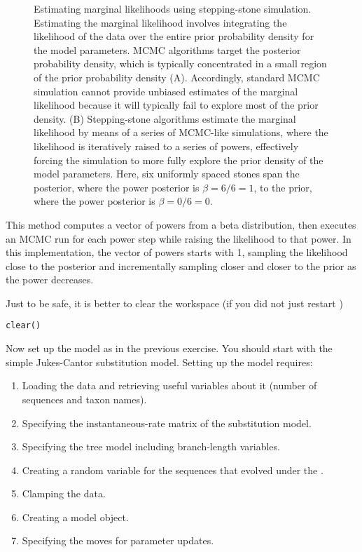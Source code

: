 \begin{figure}[h!]
\centering
{}
\caption{\small Estimating marginal likelihoods using stepping-stone simulation. 
Estimating the marginal likelihood involves integrating the likelihood of the data over the entire prior probability density for the model parameters.
MCMC algorithms target the posterior probability density, which is typically concentrated in a small region of the prior probability density (A).
Accordingly, standard MCMC simulation cannot provide unbiased estimates of the marginal likelihood because it will typically fail to explore most of the prior density.
(B) Stepping-stone algorithms estimate the marginal likelihood by means of a series of MCMC-like simulations, where the likelihood is iteratively raised to a series of powers, effectively forcing the simulation to more fully explore the prior density of the model parameters.
Here, six uniformly spaced stones span the posterior, where the power posterior is $\beta=6/6=1$, to the prior, where the power posterior is $\beta=0/6=0$.}
\label{fig:jc}
\end{figure}


This method computes a vector of powers from a beta distribution, then executes an MCMC run for each power step while raising the likelihood to that power. In this implementation, the vector of powers starts with 1, sampling the likelihood close to the posterior and incrementally sampling closer and closer to the prior as the power decreases. 

Just to be safe, it is better to clear the workspace (if you did not just restart \RevBayes)
{\tt \begin{snugshade*}
\begin{lstlisting}
clear()
\end{lstlisting}
\end{snugshade*}}

Now set up the model as in the previous exercise. You should start with the simple Jukes-Cantor substitution model. 
Setting up the model requires:
\begin{enumerate}
\item Loading the data and retrieving useful variables about it (\EG number of sequences and taxon names).
\item Specifying the instantaneous-rate matrix of the substitution model.
\item Specifying the tree model including branch-length variables.
\item Creating a random variable for the sequences that evolved under the .
\item Clamping the data.
\item Creating a model object.
\item Specifying the moves for parameter updates.
\end{enumerate}

